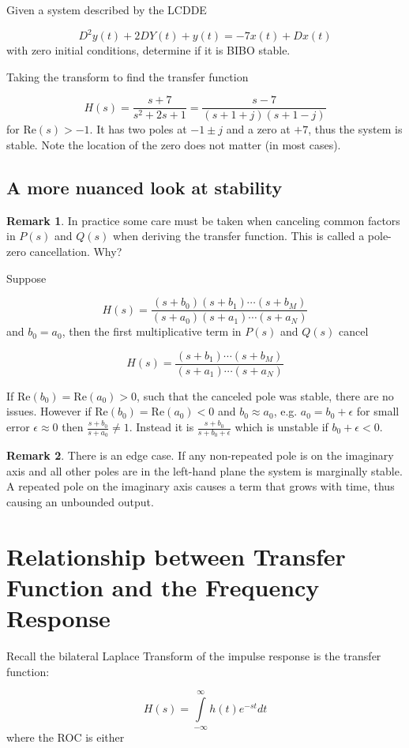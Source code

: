 \documentclass{article}
\begin{document}
Given a system described by the LCDDE

$$
D^2 y(t) + 2DY(t) + y(t) = -7 x(t) + Dx(t)
$$
with zero initial conditions, determine if it is BIBO stable.

Taking the transform to find the transfer function

$$
H(s) = \frac{s+7}{s^2 + 2s + 1} = \frac{s-7}{(s + 1 + j)(s + 1 - j)}
$$
for $\text{Re}(s) > -1$. It has two poles at $-1 \pm j$ and a zero at $+7$, thus the system is stable. Note the location of the zero does not matter (in most cases).

\subsection{A more nuanced look at stability}

\textbf{Remark 1}. In practice some care must be taken when canceling common factors in $P(s)$ and $Q(s)$ when deriving the transfer function. This is called a pole-zero cancellation. Why?

Suppose

$$
H(s) = \frac{(s+b_0)(s+b_1)\cdots(s+b_M)}{(s+a_0)(s+a_1)\cdots(s+a_N)}
$$
and $b_0 = a_0$, then the first multiplicative term in $P(s)$ and $Q(s)$ cancel 

$$
H(s) = \frac{(s+b_1)\cdots(s+b_M)}{(s+a_1)\cdots(s+a_N)}
$$

If $\text{Re}(b_0) = \text{Re}(a_0) > 0$, such that the canceled pole was stable, there are no issues. However if $\text{Re}(b_0) = \text{Re}(a_0) < 0$ and $b_0 \approx a_0$, e.g. $a_0 = b_0 + \epsilon$ for small error $\epsilon \approx 0$ then $ \frac{s+b_0}{s+a_0} \neq 1$. Instead it is $\frac{s+b_0}{s+b_0+\epsilon}$ which is unstable if $b_0 + \epsilon < 0$. 


\textbf{Remark 2}. There is an edge case. If any non-repeated pole is on the imaginary axis and all other poles are in the left-hand plane the system is marginally stable. A repeated pole on the imaginary axis causes a term that grows with time, thus causing an unbounded output.

\section{Relationship between Transfer Function and the Frequency Response}

Recall the bilateral Laplace Transform of the impulse response is the transfer function:

$$
H(s) = \int\limits_{-\infty}^{\infty} h(t) e^{-st} dt
$$
where the ROC is either
\end{document}
